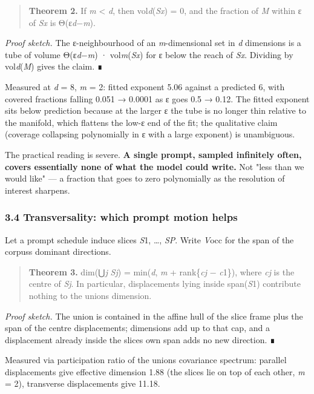 \documentclass[
  11pt,
]{article}
\theoremstyle{plain}
\theoremstyle{definition}
\begin{document}
\begin{quote}
\textbf{Theorem 2.} If \emph{m} \textless{} \emph{d}, then
vol\emph{d}(\emph{Sx}) = 0, and the fraction of \emph{M} within ε of
\emph{Sx} is Θ(ε\emph{d}−\emph{m}).
\end{quote}

\emph{Proof sketch.} The ε-neighbourhood of an \emph{m}-dimensional set
in \emph{d} dimensions is a tube of volume Θ(ε\emph{d}−\emph{m}) ·
vol\emph{m}(\emph{Sx}) for ε below the reach of \emph{Sx}. Dividing by
vol\emph{d}(\emph{M}) gives the claim. ∎

Measured at \emph{d} = 8, \emph{m} = 2: fitted exponent 5.06 against a
predicted 6, with covered fractions falling 0.051 → 0.0001 as ε goes 0.5
→ 0.12. The fitted exponent sits below prediction because at the larger
ε the tube is no longer thin relative to the manifold, which flattens
the low-ε end of the fit; the qualitative claim (coverage collapsing
polynomially in ε with a large exponent) is unambiguous.

The practical reading is severe. \textbf{A single prompt, sampled
infinitely often, covers essentially none of what the model could
write.} Not "less than we would like" --- a fraction that goes to zero
polynomially as the resolution of interest sharpens.

\subsubsection{3.4 Transversality: which prompt motion
helps}\label{34-transversality-which-prompt-motion-helps}

Let a prompt schedule induce slices \emph{S}1, \ldots, \emph{SP}. Write
\emph{V}occ for the span of the corpus\textquotesingle s dominant
directions.

\begin{quote}
\textbf{Theorem 3.} dim(⋃\emph{j} \emph{Sj}) = min(\emph{d}, \emph{m} +
rank\{\emph{cj} − \emph{c}1\}), where \emph{cj} is the centre of
\emph{Sj}. In particular, displacements lying inside span(\emph{S}1)
contribute nothing to the union\textquotesingle s dimension.
\end{quote}

\emph{Proof sketch.} The union is contained in the affine hull of the
slice frame plus the span of the centre displacements; dimensions add up
to that cap, and a displacement already inside the
slice\textquotesingle s own span adds no new direction. ∎

Measured via participation ratio of the union\textquotesingle s
covariance spectrum: parallel displacements give effective dimension
1.88 (the slices lie on top of each other, \emph{m} = 2), transverse
displacements give 11.18.
\end{document}
